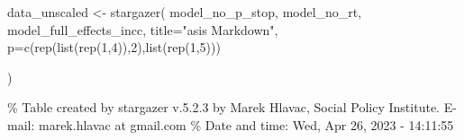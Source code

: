 \documentclass[
]{article}
\newenvironment{Shaded}{\begin{snugshade}}{\end{snugshade}}
\newcommand{\AttributeTok}[1]{\textcolor[rgb]{0.77,0.63,0.00}{#1}}
\newcommand{\DecValTok}[1]{\textcolor[rgb]{0.00,0.00,0.81}{#1}}
\newcommand{\FunctionTok}[1]{\textcolor[rgb]{0.00,0.00,0.00}{#1}}
\newcommand{\NormalTok}[1]{#1}
\newcommand{\OtherTok}[1]{\textcolor[rgb]{0.56,0.35,0.01}{#1}}
\newcommand{\StringTok}[1]{\textcolor[rgb]{0.31,0.60,0.02}{#1}}
\begin{document}
\begin{Shaded}
\begin{Highlighting}[]
\NormalTok{data\_unscaled }\OtherTok{\textless{}{-}} \FunctionTok{stargazer}\NormalTok{(}
\NormalTok{  model\_no\_p\_stop, }
\NormalTok{  model\_no\_rt, }
\NormalTok{  model\_full\_effects\_incc,}
  \AttributeTok{title=}\StringTok{"asis Markdown"}\NormalTok{,}
  \AttributeTok{p=}\FunctionTok{c}\NormalTok{(}\FunctionTok{rep}\NormalTok{(}\FunctionTok{list}\NormalTok{(}\FunctionTok{rep}\NormalTok{(}\DecValTok{1}\NormalTok{,}\DecValTok{4}\NormalTok{)),}\DecValTok{2}\NormalTok{),}\FunctionTok{list}\NormalTok{(}\FunctionTok{rep}\NormalTok{(}\DecValTok{1}\NormalTok{,}\DecValTok{5}\NormalTok{)))}
  
\NormalTok{  )}
\end{Highlighting}
\end{Shaded}

\% Table created by stargazer v.5.2.3 by Marek Hlavac, Social Policy
Institute. E-mail: marek.hlavac at gmail.com \% Date and time: Wed, Apr
26, 2023 - 14:11:55
\end{document}
